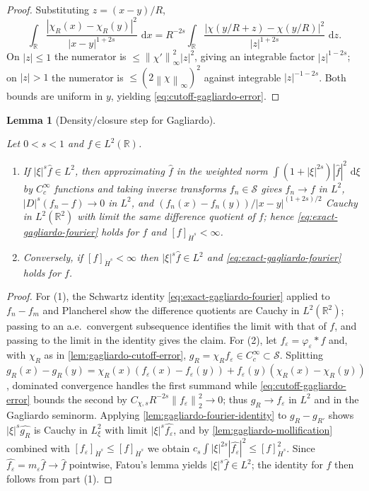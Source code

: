 \documentclass[11pt,oneside]{book}
\providecommand{\uses}[1]{}
\newtheorem{lemma}[theorem]{Lemma}
\theoremstyle{definition}
\theoremstyle{remark}
\newcommand{\R}{\mathbb R}
\newcommand{\Ssch}{\mathcal S}
\newcommand{\1}{\mathbf 1}
\newcommand{\dd}{\,\mathrm d}
\newcommand{\norm}[1]{\left\lVert #1\right\rVert}
\newcommand{\abs}[1]{\left\lvert #1\right\rvert}
\newcommand{\eps}{\varepsilon}
\begin{document}
\begin{proof}
Substituting $z=(x-y)/R$,
\[
 \int_\R\frac{\abs{\chi_R(x)-\chi_R(y)}^2}{\abs{x-y}^{1+2s}}\,\dd x
 =R^{-2s}\int_\R\frac{\abs{\chi(y/R+z)-\chi(y/R)}^2}{\abs{z}^{1+2s}}\,\dd z.
\]
On $\abs{z}\le1$ the numerator is $\le\norm{\chi'}_\infty^2\abs{z}^2$, giving an
integrable factor $\abs{z}^{1-2s}$; on $\abs{z}>1$ the numerator is
$\le(2\norm{\chi}_\infty)^2$ against integrable $\abs{z}^{-1-2s}$. Both bounds
are uniform in $y$, yielding \eqref{eq:cutoff-gagliardo-error}.
\end{proof}

\begin{lemma}[Density/closure step for Gagliardo]\label{lem:gagliardo-density}
\uses{def:Hs-space}
Let $0<s<1$ and $f\in L^2(\R)$.
\begin{enumerate}
\item If $\abs{\xi}^s\widehat f\in L^2$, then approximating $\widehat f$ in the
weighted norm $\int(1+\abs{\xi}^{2s})\abs{\widehat f}^2\,\dd\xi$ by
$C_c^\infty$ functions and taking inverse transforms $f_n\in\Ssch$ gives
$f_n\to f$ in $L^2$, $\abs{D}^s(f_n-f)\to0$ in $L^2$, and
$(f_n(x)-f_n(y))/\abs{x-y}^{(1+2s)/2}$ Cauchy in $L^2(\R^2)$ with limit the same
difference quotient of $f$; hence \eqref{eq:exact-gagliardo-fourier} holds for
$f$ and $[f]_{\dot H^s}<\infty$.
\item Conversely, if $[f]_{\dot H^s}<\infty$ then $\abs{\xi}^s\widehat f\in L^2$
and \eqref{eq:exact-gagliardo-fourier} holds for $f$.
\end{enumerate}
\end{lemma}

\begin{proof}
\uses{lem:gagliardo-fourier-identity, lem:gagliardo-mollification, lem:gagliardo-cutoff-error}
For (1), the Schwartz identity \eqref{eq:exact-gagliardo-fourier} applied to
$f_n-f_m$ and Plancherel show the difference quotients are Cauchy in
$L^2(\R^2)$; passing to an a.e.\ convergent subsequence identifies the limit
with that of $f$, and passing to the limit in the identity gives the claim.
For (2), let $f_\eps=\varphi_\eps*f$ and, with $\chi_R$ as in
\cref{lem:gagliardo-cutoff-error}, $g_R=\chi_Rf_\eps\in C_c^\infty\subset\Ssch$.
Splitting $g_R(x)-g_R(y)=\chi_R(x)(f_\eps(x)-f_\eps(y))+f_\eps(y)(\chi_R(x)-\chi_R(y))$,
dominated convergence handles the first summand while
\eqref{eq:cutoff-gagliardo-error} bounds the second by
$C_{\chi,s}R^{-2s}\norm{f_\eps}_2^2\to0$; thus $g_R\to f_\eps$ in $L^2$ and in
the Gagliardo seminorm. Applying \cref{lem:gagliardo-fourier-identity} to
$g_R-g_{R'}$ shows $\abs{\xi}^s\widehat{g_R}$ is Cauchy in $L^2_\xi$ with limit
$\abs{\xi}^s\widehat{f_\eps}$, and by \cref{lem:gagliardo-mollification}
combined with $[f_\eps]_{\dot H^s}\le[f]_{\dot H^s}$ we obtain
$c_s\int\abs{\xi}^{2s}\abs{\widehat{f_\eps}}^2\le[f]_{\dot H^s}^2$. Since
$\widehat{f_\eps}=m_\eps\widehat f\to\widehat f$ pointwise, Fatou's lemma yields
$\abs{\xi}^s\widehat f\in L^2$; the identity for $f$ then follows from part (1).
\end{proof}
\end{document}
